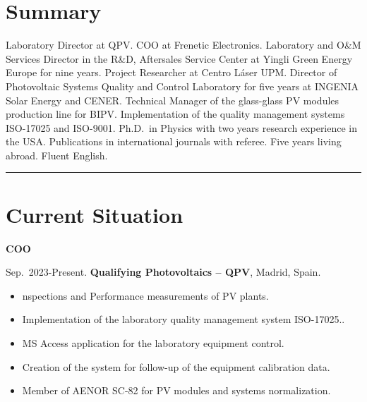 \documentclass{article}
\begin{document}



\section*{Summary}

Laboratory Director at QPV. COO at Frenetic Electronics. Laboratory and O{\&}M Services Director in the R{\&}D, Aftersales Service Center at Yingli Green Energy Europe for nine years. Project Researcher at Centro L\'aser UPM. Director of Photovoltaic Systems Quality and Control Laboratory for five years at INGENIA Solar Energy and CENER. Technical Manager of the glass-glass PV modules production line for BIPV. Implementation of the quality management systems ISO-17025 and ISO-9001. Ph.D.\ in Physics with two years research experience in the USA. Publications in international journals with referee. Five years living abroad. Fluent English.

\bigskip

\hrule


\section*{Current Situation}

{\bf COO}

\medskip
Sep.~2023-Present.
{\bf Qualifying Photovoltaics -- QPV},
Madrid, Spain.

\begin{itemize}\itemsep 0pt
\item nspections and Performance measurements of PV plants.
\item Implementation of the laboratory quality management system ISO-17025..
\item MS Access application for the laboratory equipment control.
\item Creation of the system for follow-up of the equipment calibration data.
\item Member of AENOR SC-82 for PV modules and systems normalization.
\end{itemize}
\end{document}
